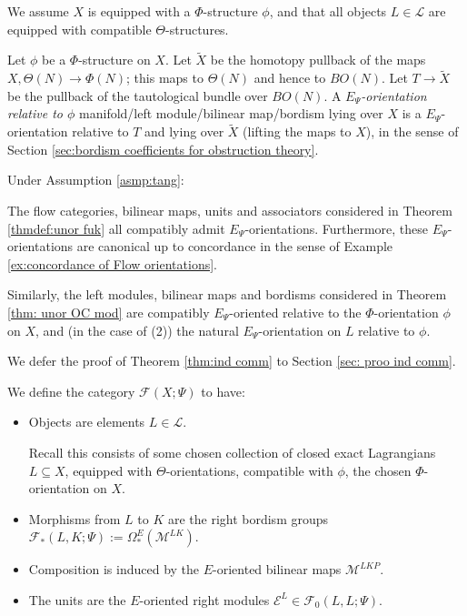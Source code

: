 \documentclass{TPmod}
\newcommand{\cE}{\mathcal{E}}
\newcommand{\cF}{\mathcal{F}}
\newcommand{\cL}{\mathcal{L}}
\newcommand{\cM}{\mathcal{M}}
\numberwithin{equation}{section}
\begin{document}
    \begin{asmp}\label{asmp:tang}
        We assume $X$ is equipped with a $\Phi$-structure $\phi$, and that all objects $L \in \cL$ are equipped with compatible $\Theta$-structures. 
    \end{asmp}

    \begin{defn}\label{def: Phi x tild}
        Let $\phi$ be a $\Phi$-structure on $X$. Let $\widetilde X$ be the homotopy pullback of the maps $X, \Theta(N) \to \Phi(N)$; this maps to $\Theta(N)$ and hence to $BO(N)$. Let $T \to \widetilde X$ be the pullback of the tautological bundle over $BO(N)$. A \emph{$E_\Psi$-orientation relative to $\phi$} manifold/left module/bilinear map/bordism lying over $X$ is a $E_\Psi$-orientation relative to $T$ and lying over $\widetilde X$ (lifting the maps to $X$), in the sense of Section \ref{sec:bordism coefficients for obstruction theory}.
    \end{defn}
    
    \begin{thm}\label{thm:ind comm}
        Under Assumption \ref{asmp:tang}: 

        The flow categories, bilinear maps, units and associators considered in Theorem \ref{thmdef:unor fuk} all compatibly admit $E_\Psi$-orientations. Furthermore, these $E_\Psi$-orientations are canonical up to concordance in the sense of Example \ref{ex:concordance of Flow orientations}.

        Similarly, the left modules, bilinear maps and bordisms considered in Theorem \ref{thm: unor OC mod} are compatibly $E_\Psi$-oriented relative to the $\Phi$-orientation $\phi$ on $X$, and (in the case of (2)) the natural $E_\Psi$-orientation on $L$ relative to $\phi$.
    \end{thm}
    We defer the proof of Theorem \ref{thm:ind comm} to Section \ref{sec: proo ind comm}.


    \begin{defn}\label{def: E fuk}
        We define the category $\cF(X; \Psi)$ to have:
        \begin{itemize}
            \item Objects are elements $L \in \cL$.

            Recall this consists of some chosen collection of closed exact Lagrangians $L \subseteq X$, equipped with $\Theta$-orientations, compatible with $\phi$, the chosen $\Phi$-orientation on $X$.
            \item Morphisms from $L$ to $K$ are the right bordism groups $\cF_*(L,K;\Psi) := \Omega_*^E(\cM^{LK})$.
            \item Composition is induced by the $E$-oriented bilinear maps $\cM^{LKP}$.
            \item The units are the $E$-oriented right modules $\cE^L \in \cF_0(L,L;\Psi)$.
        \end{itemize}
    \end{defn}
   
\end{document}
